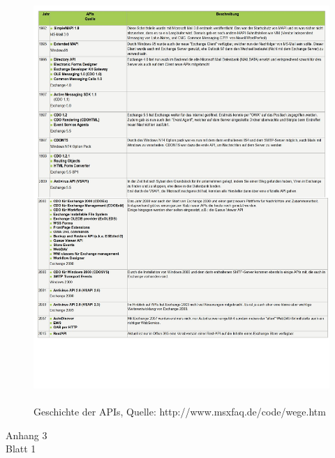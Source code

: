 \begin{figure}[h!]
\includegraphics[width=1.0\textwidth]{Abbildungen/API_Geschichte2.pdf}
\caption*{\\Geschichte der APIs, Quelle: http://www.msxfaq.de/code/wege.htm}
\label{API_Geschichte}
\end{figure}

\newpage

\begin{flushright}
Anhang 3\\
Blatt 1\\
\label{Anhang3_1}
\end{flushright}

